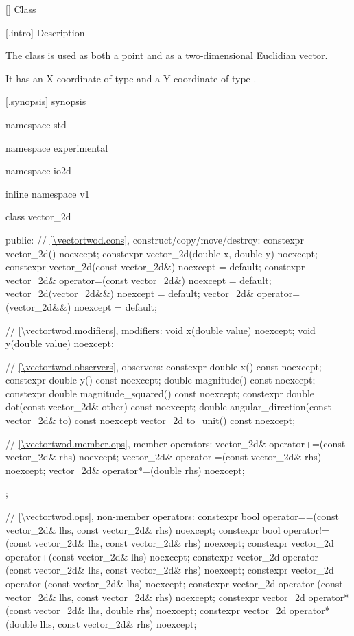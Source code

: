  [\vectortwod] {Class }

 [\vectortwod.intro] { Description}

\pnum
{}
The class  is used as both a point and as a two-dimensional Euclidian vector.

\pnum
It has an X coordinate of type  and a Y coordinate of type .

 [\vectortwod.synopsis] { synopsis}

\begin{codeblock}
namespace std { namespace experimental { namespace io2d { inline namespace v1 {
  class vector_2d {
  public:
    // \ref{\vectortwod.cons}, construct/copy/move/destroy:
    constexpr vector_2d() noexcept;
    constexpr vector_2d(double x, double y) noexcept;
    constexpr vector_2d(const vector_2d&) noexcept = default;
    constexpr vector_2d& operator=(const vector_2d&) noexcept = default;
    vector_2d(vector_2d&&) noexcept = default;
    vector_2d& operator=(vector_2d&&) noexcept = default;

    // \ref{\vectortwod.modifiers}, modifiers:
    void x(double value) noexcept;
    void y(double value) noexcept;
    
    // \ref{\vectortwod.observers}, observers:
    constexpr double x() const noexcept;
    constexpr double y() const noexcept;
    double magnitude() const noexcept;
    constexpr double magnitude_squared() const noexcept;
    constexpr double dot(const vector_2d& other) const noexcept;
    double angular_direction(const vector_2d& to) const noexcept
    vector_2d to_unit() const noexcept;
    
    // \ref{\vectortwod.member.ops}, member operators:
    vector_2d& operator+=(const vector_2d& rhs) noexcept;
    vector_2d& operator-=(const vector_2d& rhs) noexcept;
    vector_2d& operator*=(double rhs) noexcept;
  };
  
  // \ref{\vectortwod.ops}, non-member operators:
  constexpr bool operator==(const vector_2d& lhs, const vector_2d& rhs)
    noexcept;
  constexpr bool operator!=(const vector_2d& lhs, const vector_2d& rhs)
    noexcept;
  constexpr vector_2d operator+(const vector_2d& lhs) noexcept;
  constexpr vector_2d operator+(const vector_2d& lhs, const vector_2d& rhs)
    noexcept;
  constexpr vector_2d operator-(const vector_2d& lhs) noexcept;
  constexpr vector_2d operator-(const vector_2d& lhs, const vector_2d& rhs)
    noexcept;
  constexpr vector_2d operator*(const vector_2d& lhs, double rhs) noexcept;
  constexpr vector_2d operator*(double lhs, const vector_2d& rhs) noexcept;
} } } }
\end{codeblock}

